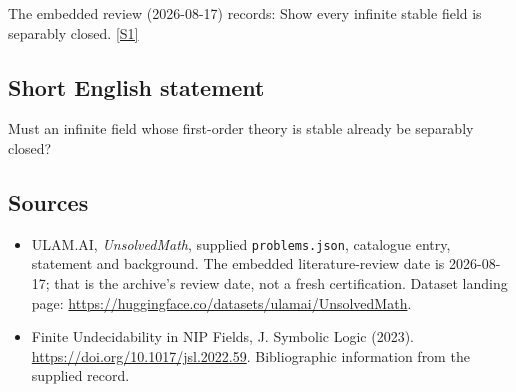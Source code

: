 \documentclass[11pt,a4paper]{article}
\newcommand{\sref}[2]{\hyperlink{source:#1:#2}{[S#2]}}
\begin{document}
The embedded review (2026-08-17) records: Show every infinite stable field is separably closed. \sref{statement}{1}

\subsection{Short English statement}

Must an infinite field whose first-order theory is stable already be separably closed?

\subsection{Sources}

{\small

\begin{itemize}

\item[\hypertarget{source:statement:1}{S1}] ULAM.AI, \emph{UnsolvedMath}, supplied \texttt{problems.json}, catalogue entry, statement and background. The embedded literature-review date is 2026-08-17; that is the archive’s review date, not a fresh certification. Dataset landing page: \url{https://huggingface.co/datasets/ulamai/UnsolvedMath}.

\item[\hypertarget{source:statement:2}{S2}] Finite Undecidability in NIP Fields, J. Symbolic Logic (2023). \url{https://doi.org/10.1017/jsl.2022.59}. Bibliographic information from the supplied record.

\end{itemize}

}

\label{end:statement}
\end{document}
